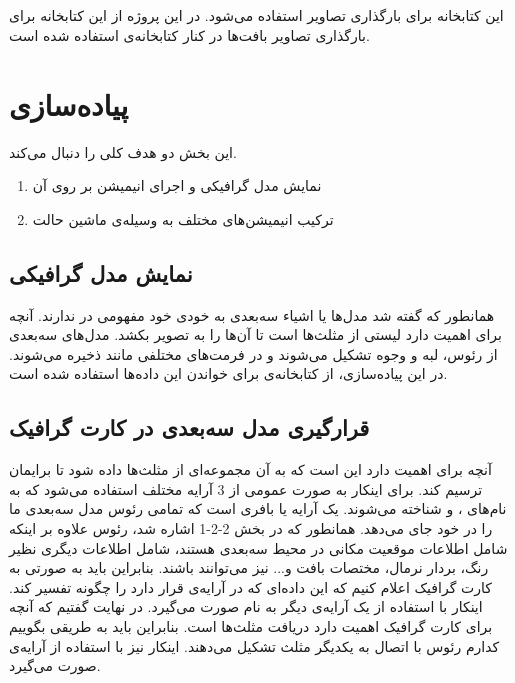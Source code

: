   
\subsection{}

این کتابخانه برای بارگذاری تصاویر استفاده می‌شود. در این پروژه از این کتابخانه برای بارگذاری
تصاویر بافت‌ها در کنار کتابخانه‌ی 
استفاده شده است.
\cite{stb}


\section{پیاده‌سازی}

این بخش دو هدف کلی را دنبال می‌کند.

\begin{enumerate}
	\item نمایش مدل گرافیکی و اجرای انیمیشن بر روی ‌آن
	\item ترکیب انیمیشن‌های مختلف به وسیله‌ی ماشین حالت

\end{enumerate}

\subsection{نمایش مدل گرافیکی}

همانطور که گفته شد مدل‌ها یا اشیاء سه‌بعدی به خودی خود مفهومی در 
ندارند. آنچه برای 
اهمیت دارد لیستی از مثلث‌ها است تا آن‌ها را به تصویر بکشد.
مدل‌های سه‌بعدی از رئوس، لبه و وجوه تشکیل می‌شوند و در فرمت‌های مختلفی مانند
ذخیره می‌شوند. در این پیا‌ده‌سازی، از کتابخانه‌ی 
برای خواندن این داده‌ها استفاده شده است.

\subsection{قرارگیری مدل سه‌بعدی در کارت گرافیک}

آنچه برای 
 اهمیت دارد این است که به آن مجموعه‌ای از مثلث‌ها داده شود تا برایمان ترسیم کند.
برای اینکار به صورت عمومی از 3 آرایه مختلف استفاده می‌شود که به نام‌های 
،
و 
شناخته می‌شوند.
یک آرایه یا بافری است که تمامی رئوس مدل سه‌بعدی ما را در خود جای می‌دهد.
همانطور که در بخش  2-2-1
اشاره شد، رئوس علاوه بر اینکه شامل اطلاعات موقعیت مکانی در محیط سه‌بعدی هستند، شامل اطلاعات دیگری 
نظیر رنگ، بردار نرمال، مختصات بافت  و... نیز می‌توانند باشند. بنابراین باید به صورتی به کارت گرافیک 
اعلام کنیم که این داده‌ای که در آرایه‌ی 
قرار دارد را چگونه تفسیر کند.
اینکار با استفاده از یک آرایه‌ی دیگر به نام 
صورت می‌گیرد.
در نهایت گفتیم که آنچه برای کارت گرافیک اهمیت دارد دریافت مثلث‌ها است. بنابراین باید به طریقی بگوییم کدارم رئوس با 
اتصال به یکدیگر مثلث تشکیل می‌دهند. اینکار نیز با استفاده از آرایه‌ی 
صورت می‌گیرد.

